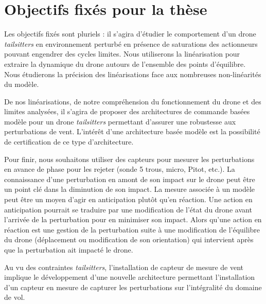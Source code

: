 \section*{Objectifs fixés pour la thèse}
{ \color{red}
Les objectifs fixés sont pluriels : il s'agira d'étudier le comportement d'un drone \textit{tailsitters} en environnement perturbé en présence de saturations des actionneurs pouvant engendrer des cycles limites. Nous utiliserons la linéarisation pour extraire la dynamique du drone autours de l'ensemble des points d'équilibre. Nous étudierons la précision des linéarisations face aux nombreuses non-linéarités du modèle. 

De nos linéarisations, de notre compréhension du fonctionnement du drone et des limites analysées, il s'agira de proposer des architectures de commande basées modèle pour un drone \textit{tailsitters} permettant d'assurer une robustesse aux perturbations de vent. L'intérêt d'une architecture basée modèle est la possibilité de certification de ce type d'architecture. 

Pour finir, nous souhaitons utiliser des capteurs pour mesurer les perturbations en avance de phase pour les rejeter (sonde 5 trous, micro, Pitot, etc.). La connaissance d'une perturbation en amont de son impact sur le drone peut être un point clé dans la diminution de son impact. La mesure associée à un modèle peut être un moyen d'agir en anticipation plutôt qu'en réaction. Une action en anticipation pourrait se traduire par une modification de l'état du drone avant l'arrivée de la perturbation pour en minimiser son impact. Alors qu'une action en réaction est une gestion de la perturbation suite à une modification de l'équilibre du drone (déplacement ou modification de son orientation) qui intervient après que la perturbation ait impacté le drone.  

Au vu des contraintes \textit{tailsitters}, l'installation de capteur de mesure de vent implique le développement d'une nouvelle architecture permettant l'installation d'un capteur en mesure de capturer les perturbations sur l'intégralité du domaine de vol.

}
